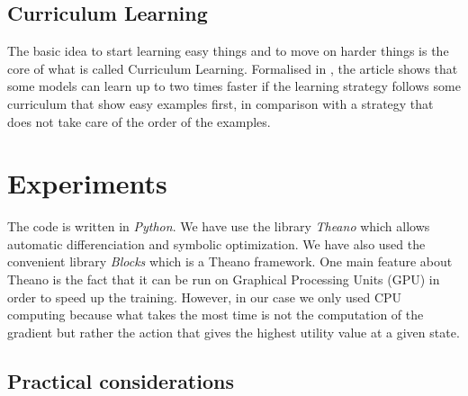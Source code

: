 \documentclass{article} %
\begin{document}
\subsection{Curriculum Learning}
The basic idea to start learning easy things and to move on harder things is the core of what is called Curriculum Learning. Formalised in \cite{curriculum}, the article shows that some models can learn up to two times faster if the learning strategy follows some curriculum that show easy examples first, in comparison with a strategy that does not take care of the order of the examples.

\section{Experiments}

The code is written in \textit{Python}. We have use the library \textit{Theano} which allows automatic differenciation and symbolic optimization. We have also used the convenient library \textit{Blocks} which is a Theano framework. One main feature about Theano is the fact that it can be run on Graphical Processing Units (GPU) in order to speed up the training. However, in our case we only used CPU computing because what takes the most time is not the computation of the gradient but rather the action that gives the highest utility value at a given state.


\subsection{Practical considerations}



\end{document}
